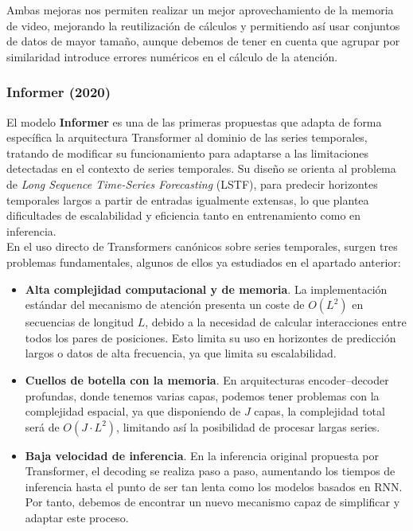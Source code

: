 Ambas mejoras nos permiten realizar un mejor aprovechamiento de la memoria de video, mejorando la reutilización de cálculos y permitiendo así usar conjuntos de datos de mayor tamaño, aunque debemos de tener en cuenta que agrupar por similaridad introduce errores numéricos en el cálculo de la atención.

\subsubsection{Informer (2020)}

El modelo \textbf{Informer} es una de las primeras propuestas que adapta de forma específica la arquitectura Transformer al dominio de las series temporales, tratando de modificar su funcionamiento para adaptarse a las limitaciones detectadas en el contexto de series temporales. Su diseño se orienta al problema de \textit{Long Sequence Time-Series Forecasting} (LSTF), para predecir horizontes temporales largos a partir de entradas igualmente extensas, lo que plantea dificultades de escalabilidad y eficiencia tanto en entrenamiento como en inferencia.\\

En el uso directo de Transformers canónicos sobre series temporales, surgen tres problemas fundamentales, algunos de ellos ya estudiados en el apartado anterior:

\begin{itemize}
	\item \textbf{Alta complejidad computacional y de memoria}. La implementación estándar del mecanismo de atención presenta un coste de $O(L^2)$ en secuencias de longitud $L$, debido a la necesidad de calcular interacciones entre todos los pares de posiciones. Esto limita su uso en horizontes de predicción largos o datos de alta frecuencia, ya que limita su escalabilidad.
	\item \textbf{Cuellos de botella con la memoria}. En arquitecturas encoder–decoder profundas, donde tenemos varias capas, podemos tener problemas con la complejidad espacial, ya que disponiendo de $J$ capas, la complejidad total será de $O(J \cdot L^2)$, limitando así la posibilidad de procesar largas series.
	\item \textbf{Baja velocidad de inferencia}. En la inferencia original propuesta por Transformer, el decoding se realiza paso a paso, aumentando los tiempos de inferencia hasta el punto de ser tan lenta como los modelos basados en RNN. Por tanto, debemos de encontrar un nuevo mecanismo capaz de simplificar y adaptar este proceso.
\end{itemize}

